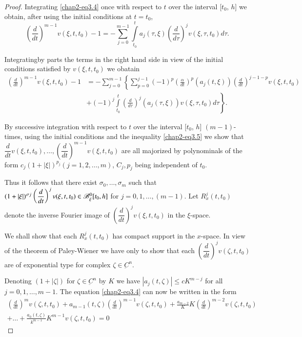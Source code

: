 \begin{proof}
Integrating \eqref{chap2-eq3.4} once with respect to $t$ over the
interval [$t_0$, $h$] we obtain,  after using the initial conditions
at $t=t_0$, 
$$
\left(\frac{d}{dt}\right)^{m-1} v (\xi, t, t_0) -1 = - \sum\limits^{m-1}_{j=0}
\int\limits^{t}_{t_0} a_j (\tau,  \xi) \left(\frac{d}{d\tau}\right)^j v (\xi,
\tau ,  t_0) d \tau. 
$$

Integrating\pageoriginale by parts the terms in the right hand side in
view of the initial conditions satisfied by $v(\xi, t, t_0)$ we
obatain  
{\fontsize{10pt}{12pt}\selectfont
\begin{align*}
\left(\frac{d}{dt}\right)^{m-1} v(\xi,  t,  t_0) - 1 &= - \sum\limits^{m-1}_{j=0}
\left\{\sum\limits^{j-1}_{p=0} (-1)^p \left(\frac{\alpha}{dt}\right)^p (a_j (t,
\xi)) \left(\frac{d}{dt}\right)^{j-1-p} v(\xi,  t, t_0)\right.\\
&\left. + (-1)^j
\int\limits^{t}_{t_0} \left(\frac{d}{d\tau}\right)^j (a_j (\tau,  \xi )) v (\xi,
\tau, t_0 ) d \tau\right\}. 
\end{align*}}\relax

By successive integration with respect to $t$ over the interval
[$t_0$, $h$] $(m-1)$-times,  using the initial conditions and the
inequality \eqref{chap2-eq3.5} we show that $\dfrac{d}{dt} v (\xi,  t,
t_0), \ldots , 
\left(\dfrac{d}{dt}\right)^{m-1} v (\xi, t, t_0)$ are all majorized by
polynominals of the form $c_j (1+|\xi|)^{p_j} (j=1, 2, \ldots , m)$,
$C_{j}, p_{j}$ being independent of $t_0$. 

Thus it follows that there exist $\sigma_0, \ldots,  \sigma_m$ such
that $(1+|\xi|)^{\sigma j} \left(\dfrac{d}{dt}\right)^j\break v (\xi, t, t_0) \in
\mathscr{B}^0_\xi [t_0,  h]$ for $j=0, 1, \ldots , (m-1)$. Let
$R^j_x(t,  t_0)$ denote the inverse Fourier image of
$\left(\dfrac{d}{dt}\right)^j v (\xi,  t, t_0)$ in the $\xi$-space. 

We shall show that each $R^j_x (t, t_0)$ has compact support in the
$x$-space. In view of the theorem of Paley-Wiener we have only to show
that each $\left(\dfrac{d}{dt}\right)^j v (\zeta,  t, t_0)$ are of
exponential type for complex $\zeta \in \underbar{C}^n$. 

Denoting $(1+|\zeta|)$ for $\zeta \in \underbar{C}^n$ by $K$ we have $|a_j
(t, \zeta) | \leq c K^{m-j}$ for all $j=0, 1, \ldots, m-1$. The equation
\eqref{chap2-eq3.4} can now be written in the form 
\begin{gather*}
\left(\frac{d}{dt}\right)^m v (\zeta, t, t_0) + a_{m-1} (t, \zeta) 
\left(\frac{d}{dt}\right)^{m-1} v(\zeta, t, t_0) + \frac{a_{m-2}}{K}
K\left(\frac{d}{dt}\right)^{m-2} v (\zeta,  t, t_0)\\
+\ldots + \frac{a_0(t,
  \zeta)}{k^{m-1}} K^{m-1} v (\zeta ,  t ,  t_0) =0 
\end{gather*}


\end{proof}
